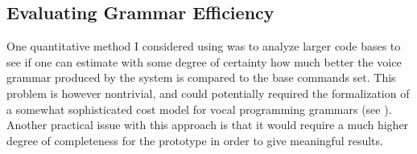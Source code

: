 \documentclass[../thesis.tex]{subfiles}
\begin{document}
\subsection{Evaluating Grammar Efficiency}
One quantitative method I considered using was to analyze larger code bases
to see if one can estimate with some degree of certainty how much better the voice grammar
produced by the system is compared to the base commands set.
This problem is however nontrivial, and could potentially
required the formalization of a somewhat sophisticated cost model for vocal programming grammars (see ).
Another practical issue with this approach is that it would require a much higher degree of completeness for the prototype
in order to give meaningful results.



\end{document}
